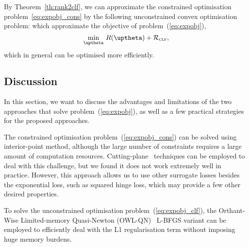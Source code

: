 By Theorem~\ref{th:rank2clf}, we can approximate the constrained optimisation problem~\ref{eq:expobj_cons}
by the following unconstrained convex optimisation problem:
which approximate the objective of problem~(\ref{eq:expobj}),
\begin{equation}
\label{eq:expobj_clf}
\min_{\uptheta} \, R(\uptheta) + \RCal_\textsc{clf},
\end{equation}
which in general can be optimised more efficiently.



\subsection{Discussion}

In this section, we want to discuss the advantages and limitations of the 
two approaches that solve problem~(\ref{eq:expobj}), 
as well as a few practical strategies for the proposed approaches.

The constrained optimisation problem~(\ref{eq:expobj_cons}) can be solved using interior-point method,
although the large number of constraints requires a large amount of computation resources.
Cutting-plane~\cite{avriel2003nonlinear} techniques can be employed to deal with this challenge, 
but we found it does not work extremely well in practice.
However, this approach allows us to use other surrogate losses besides the exponential loss,
such as squared hinge loss, which may provide a few other desired properties. %

To solve the unconstrained optimisation problem~(\ref{eq:expobj_clf}),
the Orthant-Wise Limited-memory Quasi-Newton (OWL-QN)~\cite{andrew2007scalable} L-BFGS variant can be employed to
efficiently deal with the L1 regularisation term without imposing huge memory burdens.
